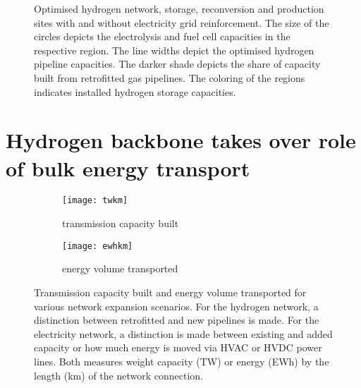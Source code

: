 \begin{figure}
    \centering
     \caption{Optimised hydrogen network, storage, reconversion and production sites with and
    without electricity grid reinforcement. The size of the circles depicts the
    electrolysis and fuel cell capacities in the respective region. The line
    widths depict the optimised hydrogen pipeline capacities. The darker shade
    depicts the share of capacity built from retrofitted gas pipelines. The
    coloring of the regions indicates installed hydrogen storage capacities.}
    \label{fig:h2-network}
\end{figure}




\section*{Hydrogen backbone takes over role of bulk energy transport}
\label{sec:energy-moved}

\begin{figure}
    \centering
        \begin{subfigure}[t]{0.49\textwidth}
            \centering
            \caption{transmission capacity built}
            \texttt{[image: twkm]}
            \label{fig:network-stats:twkm}
        \end{subfigure}
        \begin{subfigure}[t]{0.49\textwidth}
            \centering
            \caption{energy volume transported}
            \texttt{[image: ewhkm]}
            \label{fig:network-stats:ewhkm}
        \end{subfigure}
    \caption{Transmission capacity built and energy volume transported for various network
        expansion scenarios. For the hydrogen network, a distinction between
        retrofitted and new pipelines is made. For the electricity network, a
        distinction is made between existing and added capacity or how much
        energy is moved via HVAC or HVDC power lines. Both measures weight
        capacity (TW) or energy (EWh) by the length (km) of the network connection.}
    \label{fig:network-stats}
\end{figure}

